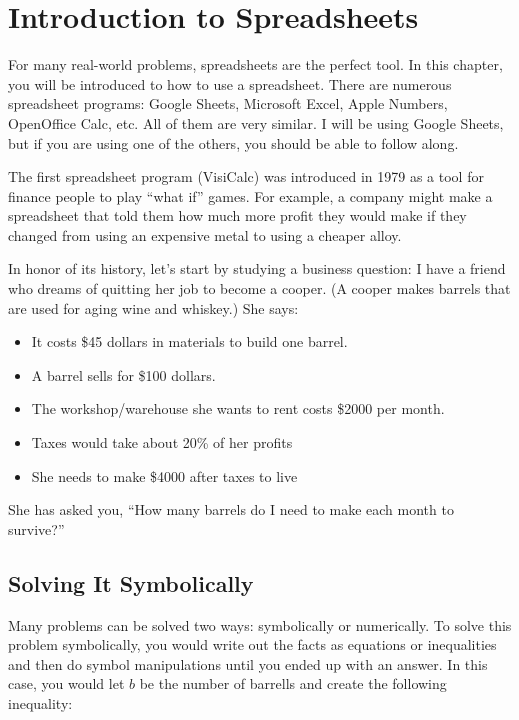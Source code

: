 \chapter{Introduction to Spreadsheets}

For many real-world problems, spreadsheets are the perfect
tool. In this chapter, you will be introduced to how to use a
spreadsheet. There are numerous spreadsheet programs: Google Sheets,
Microsoft Excel, Apple Numbers, OpenOffice Calc, etc.  All of them are
very similar. I will be using Google Sheets, but if you are using one
of the others, you should be able to follow along.

The first spreadsheet program (VisiCalc) was introduced in 1979 as a
tool for finance people to play ``what if'' games.  For example, a
company might make a spreadsheet that told them how much more profit
they would make if they changed from using an expensive metal to using
a cheaper alloy.

In honor of its history, let's start by studying a business question:
I have a friend who dreams of quitting her job to become a cooper. (A
cooper makes barrels that are used for aging wine and whiskey.)  She
says:
\begin{itemize}
\item It costs \$45 dollars in materials to build one barrel.
\item A barrel sells for \$100 dollars.
\item The workshop/warehouse she wants to rent costs \$2000 per month.
\item Taxes would take about 20\% of her profits
\item She needs to make \$4000 after taxes to live 
\end{itemize}

She has asked you, ``How many barrels do I need to make each month to survive?''

\section{Solving It Symbolically}

Many problems can be solved two ways: symbolically or
numerically. To solve this
problem symbolically, you would write out the facts as equations or
inequalities and then do symbol manipulations until you ended up with
an answer. In this case, you would let $b$ be the number of barrells
and create the following inequality:

